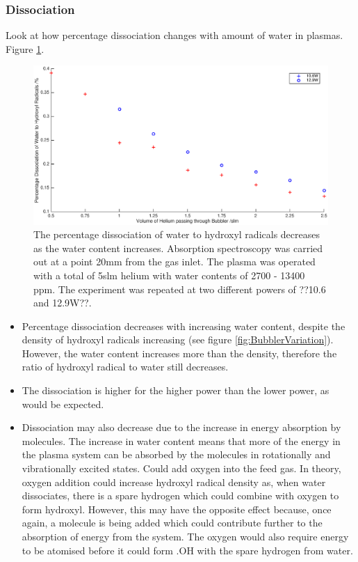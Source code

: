 \documentclass[11pt, oneside]{article}   	%
\begin{document}
\subsubsection{Dissociation}

Look at how percentage dissociation changes with amount of water in plasmas. Figure \ref{fig:BubblerDissociation}.

\begin{figure}
    \centering
    \includegraphics[width=\textwidth]{Figures/BubblerDissociation.eps}
    \caption{The percentage dissociation of water to hydroxyl radicals decreases as the water content increases. Absorption spectroscopy was carried out at a point 20mm from the gas inlet. The plasma was operated with a total of 5slm helium with water contents of 2700 - 13400 ppm. The experiment was repeated at two different powers of ??10.6 and 12.9W??.}
    \label{fig:BubblerDissociation}
\end{figure}

\begin{itemize}
    \item Percentage dissociation decreases with increasing water content, despite the density of hydroxyl radicals increasing (see figure \ref{fig:BubblerVariation}). However, the water content increases more than the density, therefore the ratio of hydroxyl radical to water still decreases.
    \item The dissociation is higher for the higher power than the lower power, as would be expected. 
    \item Dissociation may also decrease due to the increase in energy absorption by molecules. The increase in water content means that more of the energy in the plasma system can be absorbed by the molecules in rotationally and vibrationally excited states. Could add oxygen into the feed gas. In theory, oxygen addition could increase hydroxyl radical density as, when water dissociates, there is a spare hydrogen which could combine with oxygen to form hydroxyl. However, this may have the opposite effect because, once again, a molecule is being added which could contribute further to the absorption of energy from the system. The oxygen would also require energy to be atomised before it could form .OH with the spare hydrogen from water.
\end{itemize}
\end{document}
